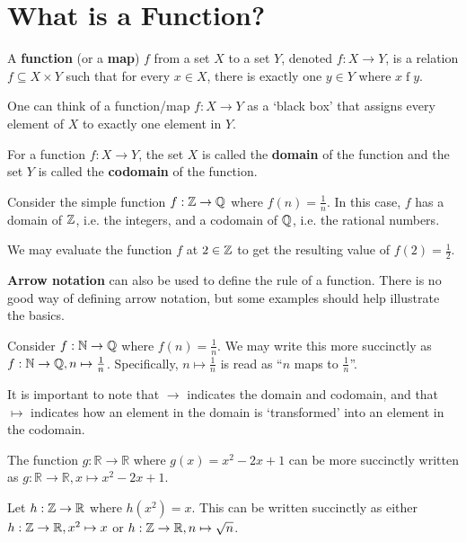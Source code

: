 \section{What is a Function?}
\begin{definition}
    A \textbf{function} (or a \textbf{map}) $f$ from a set $X$ to a set $Y$, denoted $f: X \to Y$,  is a relation $f \subseteq X \times Y$ such that for every $x \in X$, there is exactly one $y \in Y$ where $x\mathrel{f}y$.
\end{definition}
\begin{remark}
    One can think of a function/map $f:X\to Y$ as a `black box' that assigns every element of $X$ to exactly one element in $Y$.
\end{remark}
\begin{definition}
    For a function $f: X \to Y$, the set $X$ is called the \textbf{domain} of the function and the set $Y$ is called the \textbf{codomain} of the function.
\end{definition}
\begin{example}
    Consider the simple function $f: \mathbb{Z} \to \mathbb{Q}$ where $f(n) = \frac1n$. In this case, $f$ has a domain of $\mathbb{Z}$, i.e. the integers, and a codomain of $\mathbb{Q}$, i.e. the rational numbers.

    We may evaluate the function $f$ at $2 \in \mathbb{Z}$ to get the resulting value of $f(2) = \frac12$.
\end{example}

\textbf{Arrow notation} can also be used to define the rule of a function. There is no good way of defining arrow notation, but some examples should help illustrate the basics.
\begin{example}
    Consider $f: \mathbb{N} \to \mathbb{Q}$ where $f(n) = \frac1n$. We may write this more succinctly as $f: \mathbb{N} \to \mathbb{Q}, n \mapsto \frac1n$. Specifically, $n \mapsto \frac1n$ is read as ``$n$ maps to $\frac1n$''.

    It is important to note that $\to$ indicates the domain and codomain, and that $\mapsto$ indicates how an element in the domain is `transformed' into an element in the codomain.
\end{example}
\begin{example}
    The function $g: \mathbb{R} \to \mathbb{R}$ where $g(x) = x^2 - 2x + 1$ can be more succinctly written as $g: \mathbb{R} \to \mathbb{R}, x \mapsto x^2 - 2x + 1$.
\end{example}
\begin{example}
    Let $h: \mathbb{Z} \to \mathbb{R}$ where $h(x^2) = x$. This can be written succinctly as either $h: \mathbb{Z} \to \mathbb{R}, x^2 \mapsto x$ or $h: \mathbb{Z} \to \mathbb{R}, n \mapsto \sqrt n$.
\end{example}

